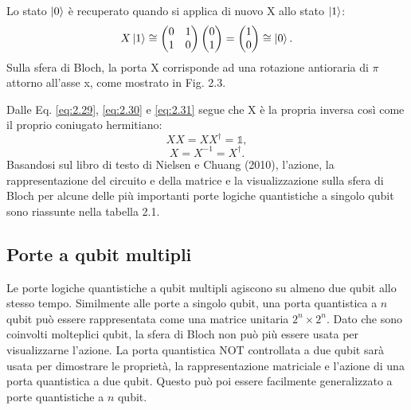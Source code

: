 Lo stato $\ket{0}$ è recuperato quando si applica di nuovo X allo stato $\ket{1}$: 
\begin{equation} \label{eq:2.31}
    X \ket{1} \cong 
    \begin{pmatrix}
        0&1\\1&0
    \end{pmatrix}
    \begin{pmatrix}
        0\\1
    \end{pmatrix}
    = 
    \begin{pmatrix}
        1\\0
    \end{pmatrix}
    \cong \ket{0}.
\end{equation}
Sulla sfera di Bloch, la porta X corrisponde ad una rotazione antioraria di $\pi$ 
attorno all'asse x, come mostrato in Fig. 2.3.


Dalle Eq. \ref{eq:2.29}, \ref{eq:2.30} e \ref{eq:2.31} segue che X è la propria 
inversa così come il proprio coniugato hermitiano: 
\begin{equation} \label{eq:2.32}
    XX = XX^\dagger = \mathbb{1},
\end{equation}
\begin{equation} \label{eq:2.33}
    X = X^{-1} = X^\dagger.
\end{equation}
Basandosi sul libro di testo di Nielsen e Chuang (2010), %
l'azione, la rappresentazione del circuito e della matrice e la visualizzazione 
sulla sfera di Bloch per alcune delle più importanti porte logiche quantistiche 
a singolo qubit sono riassunte nella tabella 2.1.


\subsection{Porte a qubit multipli}


Le porte logiche quantistiche a qubit multipli agiscono su almeno due qubit 
allo stesso tempo. Similmente alle porte a singolo qubit, una porta quantistica 
a $n$ qubit può essere rappresentata come una matrice unitaria $2^n\times2^n$. 
Dato che sono coinvolti molteplici qubit, la sfera di Bloch non può più essere 
usata per visualizzarne l'azione. La porta quantistica NOT controllata a due qubit 
sarà usata per dimostrare le proprietà, la rappresentazione matriciale e l'azione 
di una porta quantistica a due qubit. Questo può poi essere facilmente 
generalizzato a porte quantistiche a $n$ qubit. 

